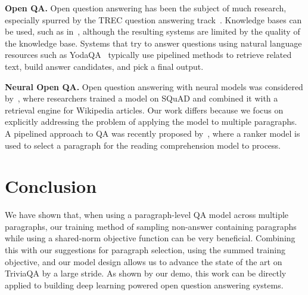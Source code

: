 \documentclass[11pt,a4paper]{article}
\begin{document}
\textbf{Open QA.}
Open question answering has been the subject of much research, especially spurred by the TREC question answering track~\cite{voorhees1999trec}. Knowledge bases can be used, such as in~\cite{berant2013semantic}, although the resulting systems are limited by the quality of the knowledge base. Systems that try to answer questions using natural language resources such as YodaQA~\cite{baudivs2015yodaqa} typically use pipelined methods to retrieve related text, build answer candidates, and pick a final output.

\textbf{Neural Open QA.}
Open question answering with neural models was considered by~\citet{openqa}, where researchers trained a model on SQuAD and combined it with a retrieval engine for Wikipedia articles. Our work differs because we focus on explicitly addressing the problem of applying the model to multiple paragraphs. A pipelined approach to QA was recently proposed by~\citet{wang2017r}, where a ranker model is used to select a paragraph for the reading comprehension model to process. 

\section{Conclusion}
We have shown that, when using a paragraph-level QA model across multiple paragraphs, our training method of sampling non-answer containing paragraphs while using a shared-norm objective function can be very beneficial.
Combining this with our suggestions for paragraph selection, using the summed training objective, and our model design allows us to advance the state of the art on TriviaQA by a large stride. 
As shown by our demo, this work can be directly applied to building deep learning powered open question answering systems.



\end{document}
